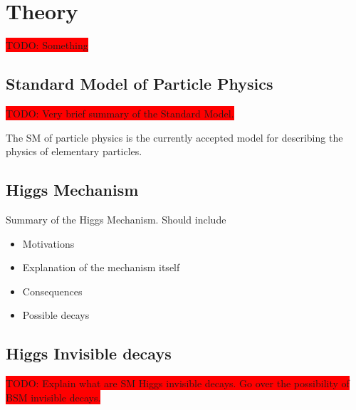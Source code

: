 \chapter{Theory}

\colorbox{red}{TODO: Something}

\section{Standard Model of Particle Physics}

\colorbox{red}{TODO: Very brief summary of the Standard Model.}

The \gls{SM} of particle physics is the currently accepted model for describing the physics of elementary particles.

\section{Higgs Mechanism}

Summary of the Higgs Mechanism. Should include
\begin{itemize}
 \item Motivations 
 \item Explanation of the mechanism itself
 \item Consequences 
 \item Possible decays
\end{itemize}

\section{Higgs Invisible decays}

\colorbox{red}{TODO: Explain what are SM Higgs invisible decays. Go over the possibility of BSM invisible decays.}
